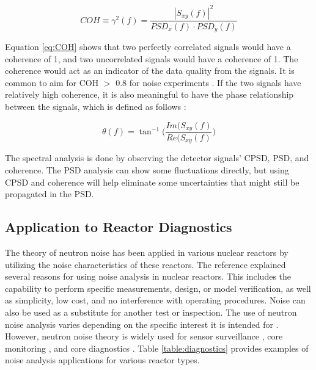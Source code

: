 \begin{equation}
    COH \equiv \gamma^2 (f) = \frac{|S_{xy} (f)|^2}{PSD_x (f) \cdot PSD_y (f)}
    \label{eq:COH}
\end{equation}

Equation \ref{eq:COH} shows that two perfectly correlated signals would have a coherence of 1, and two uncorrelated signals would have a coherence of 1. The coherence would act as an indicator of the data quality from the signals. It is common to aim for COH $>$ 0.8 for noise experiments \cite{ambrozicNoiseAnalysisTechniques2020}. If the two signals have relatively high coherence, it is also meaningful to have the phase relationship between the signals, which is defined as follows \cite{fryAnalysisNeutrondensityOscillations1975}:

\begin{equation}
    \theta (f) = \tan^{-1} \biggl( \frac{Im(S_{xy} (f)}{Re(S_{xy} (f)} \biggr)
\end{equation}

The spectral analysis is done by observing the detector signals’ CPSD, PSD, and coherence. The PSD analysis can show some fluctuations directly, but using CPSD and coherence will help eliminate some uncertainties that might still be propagated in the PSD.

\subsection{Application to Reactor Diagnostics}

The theory of neutron noise has been applied in various nuclear reactors by utilizing the noise characteristics of these reactors. The reference \cite{thiePowerReactorNoise1981} explained several reasons for using noise analysis in nuclear reactors. This includes the capability to perform specific measurements, design, or model verification, as well as simplicity, low cost, and no interference with operating procedures. Noise can also be used as a substitute for another test or inspection. The use of neutron noise analysis varies depending on the specific interest it is intended for \cite{torresNeutronNoiseAnalysis2019}. However, neutron noise theory is widely used for sensor surveillance \cite{hashemianMeasurementDynamicTemperatures2011, hashemianPracticalReviewMethods2010, montalvoAdvancedSurveillanceResistance2014}, core monitoring \cite{czibokRegularNeutronNoise2003, hashemianOnlineMonitoringApplications2011, ortiz-villafuerteBWROnlineMonitoring2006}, and core diagnostics \cite{pazsitDevelopmentsCoreBarrelMotion2016, montalvoFirstEvidencePivotal2016}. Table \ref{table:diagnostics} provides examples of noise analysis applications for various reactor types.

